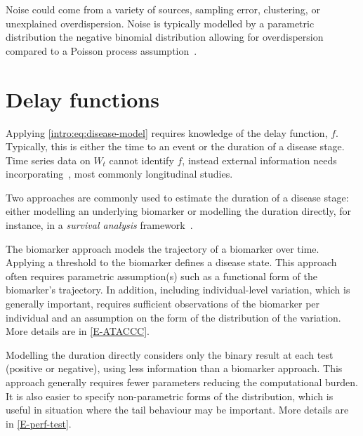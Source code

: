 \documentclass[thesis.tex]{subfiles}
\begin{document}
Noise could come from a variety of sources, \eg sampling error, clustering, or unexplained overdispersion.
Noise is typically modelled by a parametric distribution \eg the negative binomial distribution allowing for overdispersion compared to a Poisson process assumption~\autocite[e.g.][]{birrellBayesian,frassoBayesian}.

\section{Delay functions}

Applying \cref{intro:eq:disease-model} requires knowledge of the delay function, $f$.
Typically, this is either the time to an event or the duration of a disease stage.
Time series data on $W_t$ cannot identify $f$, instead external information needs incorporating~\autocite{swallow2022challenges}, most commonly longitudinal studies.

Two approaches are commonly used to estimate the duration of a disease stage: either modelling an underlying biomarker or modelling the duration directly, for instance, in a \emph{survival analysis} framework~\autocite[e.g.][]{sweetingEstimating}.

The biomarker approach models the trajectory of a biomarker over time.
Applying a threshold to the biomarker defines a disease state.
This approach often requires parametric assumption(s) such as a functional form of the biomarker's trajectory.
In addition, including individual-level variation, which is generally important, requires sufficient observations of the biomarker per individual and an assumption on the form of the distribution of the variation.
More details are in \cref{E-ATACCC}.

Modelling the duration directly considers only the binary result at each test (positive or negative), using less information than a biomarker approach.
This approach generally requires fewer parameters reducing the computational burden.
It is also easier to specify non-parametric forms of the distribution, which is useful in situation where the tail behaviour may be important.
More details are in \cref{E-perf-test}.
\end{document}
